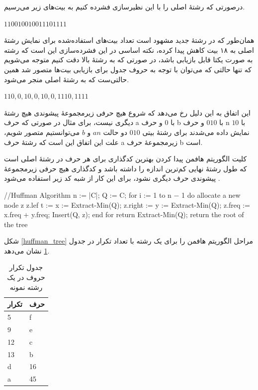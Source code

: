 درصورتی که رشتهٔ اصلی را با این نظیرسازی فشرده کنیم به بیت‌های زیر می‌رسیم.

\begin{center}
        $110010010011101111$
\end{center}

همان‌طور که در رشتهٔ جدید مشهود است تعداد بیت‌های استفاده‌شده برای نمایش
رشتهٔ اصلی به ۱۸ بیت کاهش پیدا کرده، نکته اساسی در این فشرده‌سازی 
این است که رشته به صورت یکتا قابل بازیابی باشد، در صورتی که به رشتهٔ بالا
دقت کنیم متوجه می‌شویم که تنها حالتی که می‌توان با توجه به حروف جدول برای
بازیابی بیت‌ها متصور شد همین حالتی‌ست که به رشتهٔ اصلی منجر می‌شود.
\begin{center}
        $110,0,10,0,10,0,1110,1111$ 
\end{center}

این اتفاق به این دلیل
رخ می‌دهد که شروع هیچ حرفی زیرمجموعهٔ پیشوندی هیچ رشتهٔ دیگری نیست، 
برای مثال در صورتی که حرف a با 
$0$ 
و حرف b
با 
$010$ 
و حرف 
n 
با 
$10$ 
نمایش داده می‌شدند برای رشتهٔ بیتی 
$010$
دو حالت
$an$
و 
$b$
می‌توانستیم متصور شویم، علت این اتفاق این است که رشتهٔ حرف 
a 
زیرمجموعهٔ حرف 
b
است. 

کلیت الگوریتم هافمن پیدا کردن بهترین کدگذاری برای هر حرف در رشتهٔ اصلی 
است که طول رشتهٔ نهایی کم‌ترین اندازه را داشته باشد و کدگذاری هیچ حرفی زیرمجموعهٔ پیشوندی حرف دیگری نشود، برای این کار از شبه کد زیر استفاده می‌شود \cite{huffman}.
\vspace{5mm}

\begin{code}
//Huffman Algorithm
n := |C|;
Q := C;
for i := 1 to n − 1 do
        allocate a new node z
        z.lef t := x := Extract-Min(Q);
        z.right := y := Extract-Min(Q);
        z.freq := x.freq + y.freq;
        Insert(Q, z);
end for
return Extract-Min(Q); {return the root of the tree}
\end{code}
\vspace{5mm}
شکل 
\ref{huffman_tree}
مراحل الگوریتم هافمن را برای یک رشته با تعداد تکرار در جدول
\ref{example_2}
نشان می‌دهد.


\begin{table}[H]
        \centering
        \caption{جدول تکرار حروف در یک رشته نمونه}
        \label{example_2}
        \begin{tabular}{ll}
        \hline
        تکرار & حرف \\ \hline
        5 & f \\
        9 & e \\
        12 & c \\
        13 & b \\
        d & 16 \\
        a & 45 \\ \hline
        \end{tabular}
\end{table}

